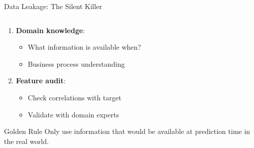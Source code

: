\documentclass[aspectratio=169,11pt]{beamer}
\begin{document}
\begin{frame}{Data Leakage: The Silent Killer}
\begin{columns}
\begin{column}{0.5\textwidth}
\begin{enumerate}
\item \textbf{Domain knowledge}:
   \begin{itemize}
   \item What information is available when?
   \item Business process understanding
   \end{itemize}

\item \textbf{Feature audit}:
   \begin{itemize}
   \item Check correlations with target
   \item Validate with domain experts
   \end{itemize}
\end{enumerate}

\begin{alertblock}{Golden Rule}
Only use information that would be available at prediction time in the real world.
\end{alertblock}
\end{column}
\end{columns}
\end{frame}
\end{document}
